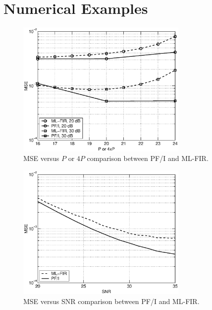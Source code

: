 \documentclass[11pt,draftnofoot,onecolumn]{IEEEtran}
\begin{document}
\section{Numerical Examples}
\label{sec5}

\begin{figure}[t]
\centering
\includegraphics[height=2.6in]{fig/fig_ch_MSE_MCCM_50ns27sc_4p.eps}
\caption{MSE versus $P$ or $4P$ comparison between PF/I and ML-FIR.}
\label{fig_MSE_vs_P}
\end{figure}

\begin{figure}[t]
\centering
\includegraphics[height=2.6in]{fig/fig_ch_MSE_MCCM_SNR_4p.eps}
\caption{MSE versus SNR comparison between PF/I and ML-FIR.}
\label{fig_MSE_vs_SNR}
\end{figure}
\end{document}
